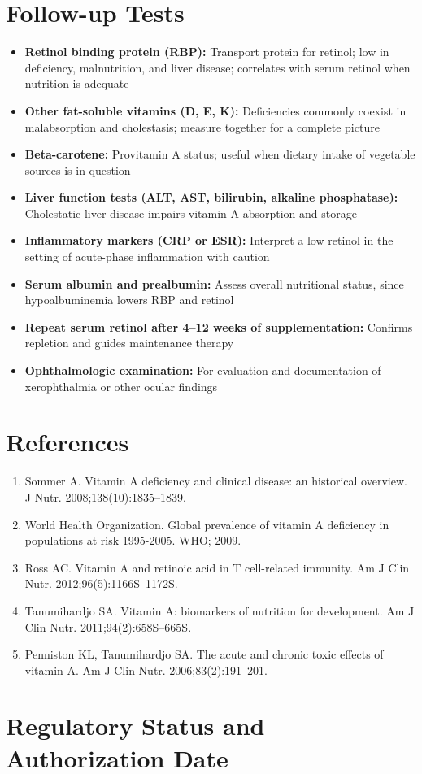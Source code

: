 \section*{Follow-up Tests}
\begin{itemize}
  \item \textbf{Retinol binding protein (RBP):} Transport protein for retinol; low in deficiency, malnutrition, and liver disease; correlates with serum retinol when nutrition is adequate
  \item \textbf{Other fat-soluble vitamins (D, E, K):} Deficiencies commonly coexist in malabsorption and cholestasis; measure together for a complete picture
  \item \textbf{Beta-carotene:} Provitamin A status; useful when dietary intake of vegetable sources is in question
  \item \textbf{Liver function tests (ALT, AST, bilirubin, alkaline phosphatase):} Cholestatic liver disease impairs vitamin A absorption and storage
  \item \textbf{Inflammatory markers (CRP or ESR):} Interpret a low retinol in the setting of acute-phase inflammation with caution
  \item \textbf{Serum albumin and prealbumin:} Assess overall nutritional status, since hypoalbuminemia lowers RBP and retinol
  \item \textbf{Repeat serum retinol after 4--12 weeks of supplementation:} Confirms repletion and guides maintenance therapy
  \item \textbf{Ophthalmologic examination:} For evaluation and documentation of xerophthalmia or other ocular findings
\end{itemize}

\section*{References}
\begin{enumerate}
  \item Sommer A. Vitamin A deficiency and clinical disease: an historical overview. J Nutr. 2008;138(10):1835--1839.
  \item World Health Organization. Global prevalence of vitamin A deficiency in populations at risk 1995-2005. WHO; 2009.
  \item Ross AC. Vitamin A and retinoic acid in T cell-related immunity. Am J Clin Nutr. 2012;96(5):1166S--1172S.
  \item Tanumihardjo SA. Vitamin A: biomarkers of nutrition for development. Am J Clin Nutr. 2011;94(2):658S--665S.
  \item Penniston KL, Tanumihardjo SA. The acute and chronic toxic effects of vitamin A. Am J Clin Nutr. 2006;83(2):191--201.
\end{enumerate}

\clearpage
\section*{Regulatory Status and Authorization Date}

\clearpage
